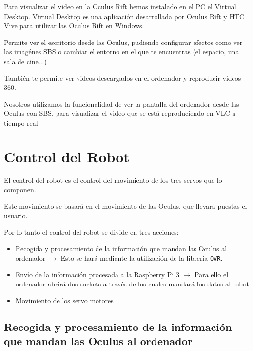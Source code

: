\documentclass[twoside, 12pt]{epstfg}
\begin{document}
Para visualizar el video en la Oculus Rift hemos instalado en el PC el  Virtual Desktop. Virtual Desktop es una aplicación desarrollada por Oculus Rift y  HTC Vive para utilizar las Oculus Rift en Windows.

Permite ver el escritorio desde las Oculus, pudiendo configurar efectos como ver las imagénes SBS o cambiar el entorno en el que te encuentras (el espacio, una sala de cine...)



También te permite ver videos descargados en el ordenador y reproducir videos 360.

Nosotros utilizamos la funcionalidad de ver la pantalla del ordenador desde las Oculus con SBS, para visualizar el video que se está reproduciendo en VLC a tiempo real.



\newpage

\section{Control del Robot}
El control del robot es el control del movimiento de los tres servos que lo componen. 

Este movimiento se basará en el movimiento de las Oculus, que llevará puestas el usuario.

Por lo tanto el control del robot se divide en tres acciones:
\begin{itemize}
	\item Recogida y procesamiento de la información que mandan las Oculus al ordenador $\rightarrow$ Esto se hará mediante la utilización de la librería \texttt{OVR}.
	
	\item Envío de la información procesada a la Raspberry Pi 3 $\rightarrow$ Para ello el ordenador abrirá dos sockets a través de los cuales mandará los datos al robot
	
	\item Movimiento de los servo motores
\end{itemize}
\subsection{Recogida y procesamiento de la información que mandan las Oculus al ordenador}
\end{document}
